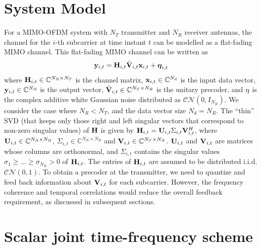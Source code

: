 \documentclass[journal,10pt,twocolumn]{IEEEtran}
\def\bx{{\bf x}}
\def\by{{\bf y}}
\def\bH{{\bf H}}
\def\bU{{\bf U}}
\def\bV{{\bf V}}
\begin{document}
\section{System Model}
For a MIMO-OFDM system with $N_T$ transmitter and $N_R$ receiver
antennas, the channel for the $i$-th subcarrier at time instant $t$
can be modelled as a flat-fading MIMO channel. This flat-fading MIMO
channel can be written as
\label{section2}
\begin{equation}
\by_{i,t} = \bH_{i,t}\tilde{\bV}_{i,t} \bx_{i,t}+ {\boldsymbol{\eta}}_{i,t}
\end{equation}
where $\bH_{i,t} \in \mathbb{C}^{N_R \times N_T}$ is the channel
matrix, $\bx_{i,t} \in \mathbb{C}^{N_d}$ is the input data vector,
$\by_{i,t} \in \mathbb{C}^{N_R}$ is the output vector,
$\tilde{\bV}_{i,t} \in \mathbb{C}^{N_T \times N_R}$ is the unitary
precoder, and $\bf{\eta}$ is the complex additive white Gaussian noise
distributed as ${\mathcal{CN}}(0,I_{N_R})$. We consider the case where
$N_R < N_T$, and the data vector size $N_d = N_R$.  The ``thin'' SVD
(that keeps only those right and left singular vectors that correspond
to non-zero singular values) of $\bH$ is given by
$\bH_{i,t} = \bU_{i,t} \Sigma_{i,t} \bV_{i,t}^{H}$, where
$\bU_{i,t} \in \mathbb{C}^{N_R \times N_R}$,
$\Sigma_{i,t} \in \mathbb{C}^{N_R \times N_R}$ and
$\bV_{i,t} \in \mathbb{C}^{N_T \times N_R}$. $\bU_{i,t}$ and
$\bV_{i,t}$ are matrices whose columns are orthonormal, and
$\Sigma_{i,t}$ contains the singular values
$\sigma_1 \geq \ldots \geq \sigma_{N_R} > 0$ of $\bH_{i,t}$. The
entries of $\bH_{i,t}$ are assumed to be distributed
i.i.d. $\mathcal{CN}(0,1)$. To obtain a precoder at the
transmitter, we need to quantize and feed back information about
$\bV_{i,t}$ for each subcarrier. However, the frequency coherence and
temporal correlations would reduce the overall feedback requirement,
as discussed in subsequent sections.

\section{Scalar joint time-frequency scheme}
\end{document}
